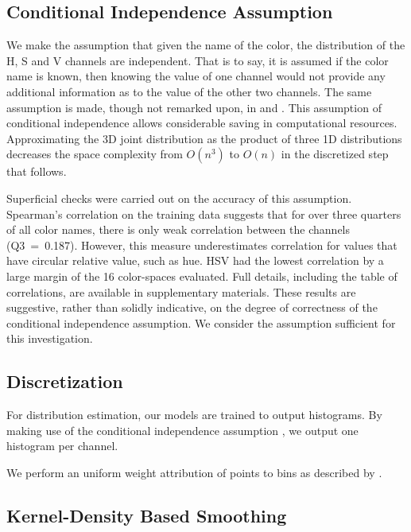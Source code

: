 \documentclass[11pt,a4paper]{article}
\newcommand{\textcite}{\citet}
\begin{document}
\subsection{Conditional Independence Assumption}\label{sec:conditional-independence-assumption}
We make the assumption that given the name of the color, the distribution of the H, S and V channels are independent.
That is to say, it is assumed if the color name is known, then  knowing the value of one channel would not provide any additional information as to the value of the other two channels.
The same assumption is made, though not remarked upon, in \textcite{meomcmahanstone:color} and \textcite{mcmahan2015bayesian}.
This assumption of conditional independence allows considerable saving in computational resources.
Approximating the 3D joint distribution as the product of three 1D distributions decreases the space complexity from $O(n^3)$ to $O(n)$ in the discretized step that follows.

Superficial checks were carried out on the accuracy of this assumption.
Spearman's correlation on the training data suggests that for over three quarters of all color names, there is only weak correlation between the channels (\mbox{Q3 = 0.187}).
However, this measure underestimates correlation for values that have circular relative value, such as hue.
HSV had the lowest correlation by a large margin of the 16 color-spaces evaluated.
Full details, including the table of correlations, are available in supplementary materials.
These results are suggestive, rather than solidly indicative, on the degree of correctness of the conditional independence assumption.
We consider the assumption sufficient for this investigation.

\subsection{Discretization}\label{sec:discretization}
For distribution estimation, our models are trained to output histograms.
By making use of the conditional independence assumption , we output one histogram per channel.

We perform an uniform weight attribution of points to bins as described by \textcite{jones1984remark}.


\subsection{Kernel-Density Based Smoothing}\label{sec:kernel-density-based-smoothing}
\end{document}
